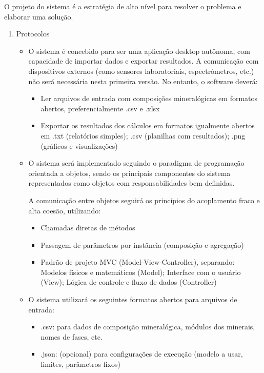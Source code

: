 O projeto do sistema é a estratégia de alto nível para resolver o problema e elaborar uma
solução.
\begin{enumerate}
\item Protocolos

\begin{itemize}
\item O sistema é concebido para ser uma aplicação desktop autônoma, com capacidade de importar dados e exportar resultados. A comunicação com dispositivos externos (como sensores laboratoriais, espectrômetros, etc.) não será necessária nesta primeira versão. No entanto, o software deverá:

\begin{itemize}
\item Ler arquivos de entrada com composições mineralógicas em formatos abertos, preferencialmente .csv e .xlsx
\item Exportar os resultados dos cálculos em formatos igualmente abertos em .txt (relatórios simples); .csv (planilhas com resultados); .png (gráficos e visualizações)
\end{itemize}
\item O sistema será implementado seguindo o paradigma de programação orientada a objetos, sendo os principais componentes do sistema representados como objetos com responsabilidades bem definidas.

A comunicação entre objetos seguirá os princípios do acoplamento fraco e alta coesão, utilizando:

\begin{itemize}
\item Chamadas diretas de métodos
\item Passagem de parâmetros por instância (composição e agregação)
\item Padrão de projeto MVC (Model-View-Controller), separando: Modelos físicos e matemáticos (Model); Interface com o usuário (View); Lógica de controle e fluxo de dados (Controller)
\end{itemize}

\item O sistema utilizará os seguintes formatos abertos para arquivos de entrada:

\begin{itemize}
\item .csv: para dados de composição mineralógica, módulos dos minerais, nomes de fases, etc.
\item .json: (opcional) para configurações de execução (modelo a usar, limites, parâmetros fixos)
\end{itemize}


\end{itemize}
\end{enumerate}
